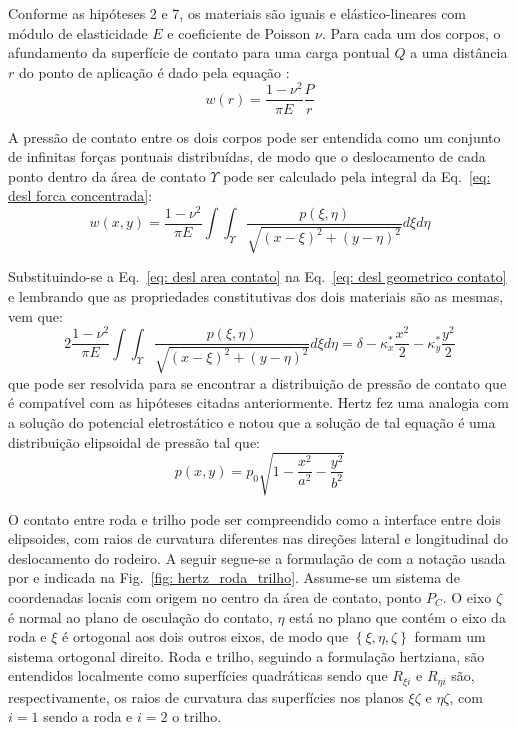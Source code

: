 Conforme as hipóteses 2 e 7, os materiais são iguais e elástico-lineares com módulo de elasticidade $E$ e 
coeficiente de Poisson $\nu$. Para cada um dos corpos, o afundamento da superfície de contato para uma 
carga pontual $Q$ a uma distância $r$ do ponto de aplicação é dado pela equação \cite{singer_introduction_1992}:
\begin{equation}
    w(r) = \frac{1-\nu^2}{\pi E} \frac{P}{r}
    \label{eq: desl forca concentrada}
\end{equation}

A pressão de contato entre os dois corpos pode ser entendida como um conjunto de infinitas forças pontuais distribuídas, 
de modo que o deslocamento de cada ponto dentro da área de contato $\Upsilon$ pode ser calculado pela integral da Eq.~\eqref{eq: desl forca concentrada}:
\begin{equation}
    w(x,y) = \frac{1-\nu^2}{\pi E} \int\int_\Upsilon {\frac{p(\xi,\eta)}{\sqrt{(x-\xi)^2 + (y-\eta)^2}}d\xi d\eta}
    \label{eq: desl area contato}
\end{equation}

Substituindo-se a Eq.~\eqref{eq: desl area contato} na Eq.~\eqref{eq: desl geometrico contato} e lembrando que 
as propriedades constitutivas dos dois materiais são as mesmas, vem que:
\begin{equation}
    2\frac{1-\nu^2}{\pi E} \int\int_\Upsilon {\frac{p(\xi,\eta)}{\sqrt{(x-\xi)^2 + (y-\eta)^2}}d\xi d\eta} = \delta - \kappa_x^* \frac{x^2}{2} -  \kappa_y^* \frac{y^2}{2}
\end{equation}
que pode ser resolvida para se encontrar a distribuição de pressão de contato que é compatível com as hipóteses citadas anteriormente. Hertz fez uma analogia com a solução
do potencial eletrostático e notou que a solução de tal equação é uma distribuição elipsoidal de pressão tal que:
\begin{equation}
    p(x,y) = p_0 \sqrt{1-\frac{x^2}{a^2} - \frac{y^2}{b^2}}
    \label{eq: pressao_hertz}
\end{equation}

O contato entre roda e trilho pode ser compreendido como a interface entre dois elipsoides, com raios de curvatura diferentes nas direções lateral
e longitudinal do deslocamento do rodeiro. A seguir segue-se a formulação de  com a notação usada por  e indicada na Fig.~\ref{fig: hertz_roda_trilho}. Assume-se um sistema de coordenadas locais com origem no centro
da área de contato, ponto $P_C$. O eixo $\zeta$ é normal ao plano de osculação do contato, $\eta$ está no plano que contém o eixo da roda e $\xi$
é ortogonal aos dois outros eixos, de modo que $\left\{\xi,\eta,\zeta\right\}$ formam um sistema ortogonal direito. Roda e trilho, seguindo a formulação hertziana, são entendidos localmente como superfícies quadráticas sendo que $R_{\xi i}$ e $R_{\eta i}$ são, respectivamente, os raios de curvatura das superfícies nos planos $\xi\zeta$ e $\eta\zeta$, com $i=1$ sendo a roda e $i=2$ o trilho.

